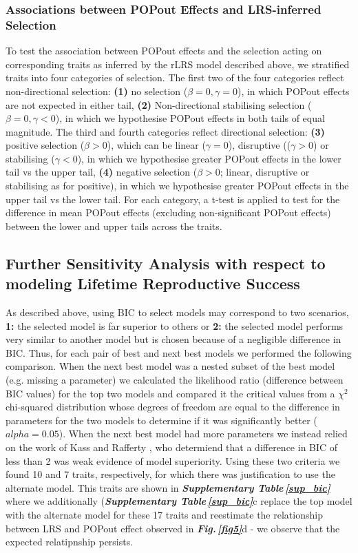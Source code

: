 \documentclass[12pt]{zHenriquesLab-StyleBioRxiv}
\newcommand\fref[1]{\normalsize{\textbf{\textit{Fig.\,\ref{#1}}}}\normalsize{}}
\newcommand\stref[1]{\normalsize{\textbf{\textit{Supplementary Table\,\ref{#1}}}}\normalsize{}}
\begin{document}
{{%
\subsubsection*{Associations between POPout Effects and LRS-inferred Selection}
To test the association between POPout effects and the selection acting on 
corresponding traits as inferred by the rLRS model described above, we stratified 
traits into four categories of selection. The first two of the four categories reflect non-directional 
selection: \textbf{(1)} no selection ($\beta=0,\gamma=0$), in which POPout 
effects are not expected in either tail, \textbf{(2)} Non-directional stabilising 
selection ($\beta=0,\gamma<0$), in which we hypothesise POPout effects 
in both tails of equal magnitude. The third and fourth categories reflect directional selection: 
\textbf{(3)} positive selection ($\beta>0$), which can be linear ($\gamma=0$), disruptive 
(($\gamma>0$) or stabilising ($\gamma<0$), in which we hypothesise greater 
POPout effects in the lower tail vs the upper tail, \textbf{(4)} negative 
selection ($\beta>0$; linear, disruptive or stabilising as for positive), in which we 
hypothesise greater POPout effects in the upper tail vs the lower tail. For each category, 
a t-test is applied to test for the difference in mean POPout effects (excluding non-significant 
POPout effects) between the lower and upper tails across the traits.


{\color{blue}

\subsection*{Further Sensitivity Analysis with respect to modeling Lifetime Reproductive Success} 

As described above, using BIC to select models may correspond to two scenarios, \textbf{1:} the 
selected model is far superior to others or \textbf{2:} the selected model performs very similar to 
another model but is chosen because of a negligible difference in BIC.  Thus, for each pair of best 
and next best models we performed the following comparison.  When the next best model was a nested 
subset of the best model (e.g. missing a parameter) we calculated the likelihood ratio 
(difference between BIC values) for the top two models and compared it the critical values 
from a $\chi^2$ chi-squared distribution whose degrees of freedom are equal to the difference 
in parameters for the two models to determine if it was significantly better ($alpha=0.05$).  When the next best 
model had more parameters we instead relied on the work of Kass and Rafferty \cite{bayesguys}, who 
determiend that a difference in BIC of less than 2 was weak evidence of model superiority. Using these 
two criteria we found 10 and 7 traits, respectively, for which there was justification to use the 
alternate model.  This traits are shown in \stref{sup_bic} where we additionally (\stref{sup_bic}{c} 
replace the top model with the alternate model for these 17 traits and reestimate the relationship 
between LRS and POPout effect observed in \fref{fig5}{d} - we observe that the expected relatipnship persists.   




}}}
\end{document}
